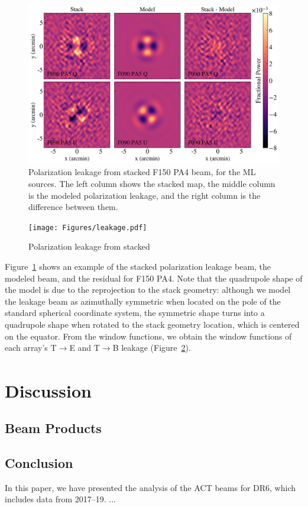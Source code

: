 \begin{figure}[t]
    \centering
    \includegraphics[width = \textwidth]{Figures/polbeams.png}
    \caption{Polarization leakage from stacked F150 PA4 beam, for the ML sources.  The left column shows the stacked map, the middle column is the modeled polarization leakage, and the right column is the difference between them.}
    \label{fig:polmodel}
\end{figure}



\begin{figure}
    \centering
    \texttt{[image: Figures/leakage.pdf]}
    \caption{Polarization leakage from stacked}
    \label{fig:leakage}
\end{figure}

Figure~\ref{fig:polmodel} shows an example of the stacked polarization leakage beam, the modeled beam, and the residual for F150 PA4. Note that the quadrupole shape of the model is due to the reprojection to the stack geometry: although we model the leakage beam as azimuthally symmetric when located on the pole of the standard spherical coordinate system, the symmetric shape turns into a quadrupole shape when rotated to the stack geometry location, which is centered on the equator. From the window functions, we obtain the window functions of each array's T$\xrightarrow[]{}$E and T$\xrightarrow[]{}$B leakage (Figure~\ref{fig:leakage}).


\section{Discussion}
\label{sec:act_disc}

\subsection{Beam Products}
\label{subsec:prods}

\subsection{Conclusion}
\label{subsec:concl}
In this paper, we have presented the analysis of the ACT beams for DR6, which includes data from 2017--19. ...